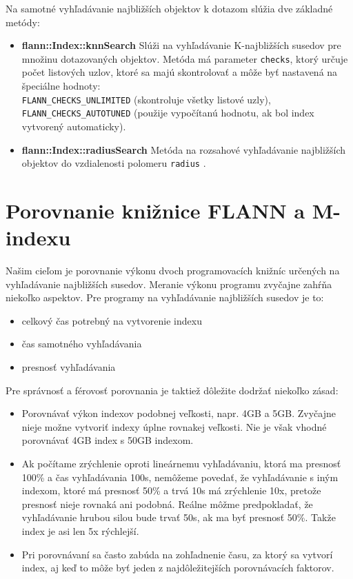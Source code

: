 \documentclass[12pt,a4paper,oneside]{fithesis2}
\begin{document}
Na samotné vyhľadávanie najbližších objektov k dotazom slúžia dve základné metódy:

\begin{itemize}
	\item \textbf{flann::Index::knnSearch} Slúži na vyhľadávanie K-najbližších susedov pre množinu dotazovaných objektov. Metóda má parameter \texttt{checks}, ktorý určuje počet listových uzlov, ktoré sa majú skontrolovať a môže byť nastavená na špeciálne hodnoty:\\ \texttt{FLANN\_CHECKS\_UNLIMITED} (skontroluje všetky listové uzly),\\ \texttt{FLANN\_CHECKS\_AUTOTUNED} (použije vypočítanú hodnotu, ak bol index vytvorený automaticky).

	\item \textbf{flann::Index::radiusSearch} Metóda na rozsahové vyhľadávanie najbližších objektov do vzdialenosti polomeru \texttt{radius} \cite{manual}. 

\end{itemize}

		

    \chapter{Porovnanie knižnice FLANN a M-indexu}
    Našim cieľom je porovnanie výkonu dvoch programovacích knižníc určených na vyhľadávanie najbližších susedov. Meranie výkonu programu zvyčajne zahŕňa niekoľko aspektov. Pre programy na vyhľadávanie najbližších susedov je to:
    \begin{itemize}
    \item celkový čas potrebný na vytvorenie indexu
    \item čas samotného vyhľadávania
    \item presnosť vyhľadávania
\end{itemize}   
Pre správnosť a férovosť porovnania je taktiež dôležite dodržať niekoľko zásad:
\begin{itemize}
\item Porovnávať výkon indexov podobnej veľkosti, napr. 4GB a 5GB. Zvyčajne nieje možne vytvoriť indexy úplne rovnakej veľkosti. Nie je však vhodné porovnávať 4GB index s 50GB indexom.

\item Ak počítame zrýchlenie oproti lineárnemu vyhľadávaniu, ktorá ma presnosť 100\% a čas vyhľadávania 100s, nemôžeme povedať, že vyhľadávanie s iným indexom, ktoré má presnosť 50\% a trvá 10s má zrýchlenie 10x, pretože presnosť nieje rovnaká ani podobná. Reálne môžme predpokladať, že vyhľadávanie hrubou silou bude trvať 50s, ak ma byť presnosť 50\%. Takže index je asi len 5x rýchlejší.

\item Pri porovnávaní sa často zabúda na zohľadnenie času, za ktorý sa vytvorí index, aj keď to môže byť jeden z najdôležitejších porovnávacích faktorov.
\end{itemize}
  
\end{document}
